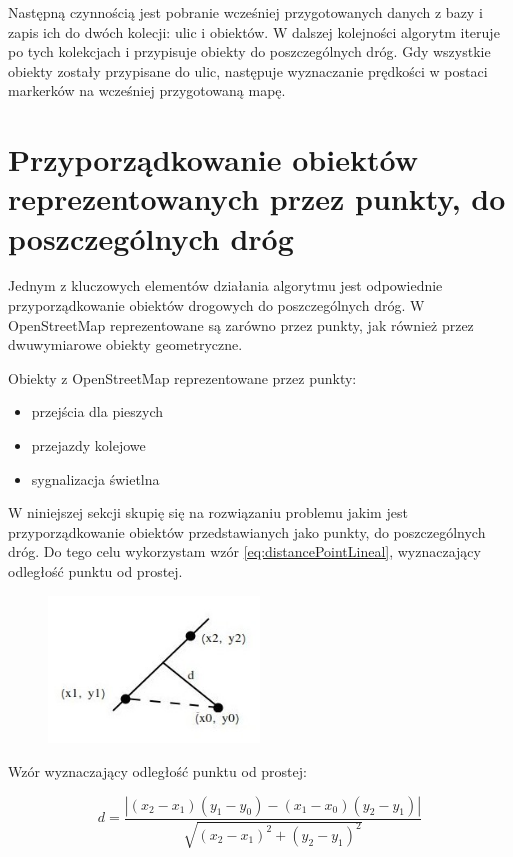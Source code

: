 Następną czynnością jest pobranie wcześniej przygotowanych danych z bazy i zapis ich do dwóch kolecji: ulic i obiektów. W dalszej kolejności algorytm iteruje po tych kolekcjach i przypisuje obiekty do poszczególnych dróg. Gdy wszystkie obiekty zostały przypisane do ulic, następuje wyznaczanie prędkości w postaci markerków na wcześniej przygotowaną mapę.

\newpage
\section{Przyporządkowanie obiektów reprezentowanych przez punkty, do poszczególnych dróg}
\label{sec:ObiektyPunktDrogi}

Jednym z kluczowych elementów działania algorytmu jest odpowiednie przyporządkowanie obiektów drogowych do poszczególnych dróg. W OpenStreetMap reprezentowane są zarówno przez punkty, jak również przez dwuwymiarowe obiekty geometryczne.


Obiekty z OpenStreetMap reprezentowane przez punkty:
\begin{itemize}
\item przejścia dla pieszych
\item przejazdy kolejowe
\item sygnalizacja świetlna
\end{itemize}


W niniejszej sekcji skupię się na rozwiązaniu problemu jakim jest przyporządkowanie obiektów przedstawianych jako punkty, do poszczególnych dróg. Do tego celu wykorzystam wzór \ref{eq:distancePointLineal}, wyznaczający odległość punktu od prostej.

\begin{figure}[h]
\centering
\includegraphics[width=0.5\textwidth]{dlugoscPktOdProstej}
\end{figure}

Wzór wyznaczający odległość punktu od prostej:

\begin{equation} \label{eq:distancePointLineal}
d = \frac{| (x_2 - x_1)(y_1 - y_0) - (x_1 - x_0)(y_2 - y_1) |}{\sqrt{(x_2 - x_1)^2 + (y_2 - y_1)^2}}
\end{equation}\newline

